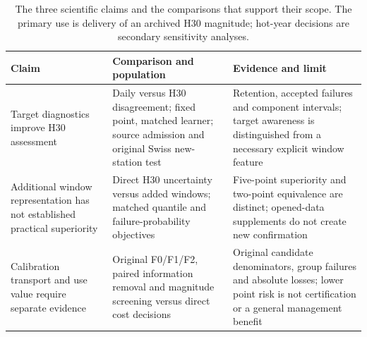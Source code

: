\begin{table}
\caption{The three scientific claims and the comparisons that support their scope. The primary use is delivery of an archived H30 magnitude; hot-year decisions are secondary sensitivity analyses.}
\label{tab:threeclaims}
\centering
\tabletext
\begin{tabularx}{\textwidth}{YYY}
\toprule
Claim & Comparison and population & Evidence and limit \\
\midrule
Target diagnostics improve H30 assessment & Daily versus H30 disagreement; fixed point, matched learner; source admission and original Swiss new-station test & Retention, accepted failures and component intervals; target awareness is distinguished from a necessary explicit window feature \\
Additional window representation has not established practical superiority & Direct H30 uncertainty versus added windows; matched quantile and failure-probability objectives & Five-point superiority and two-point equivalence are distinct; opened-data supplements do not create new confirmation \\
Calibration transport and use value require separate evidence & Original F0/F1/F2, paired information removal and magnitude screening versus direct cost decisions & Original candidate denominators, group failures and absolute losses; lower point risk is not certification or a general management benefit \\
\bottomrule
\end{tabularx}
\end{table}
